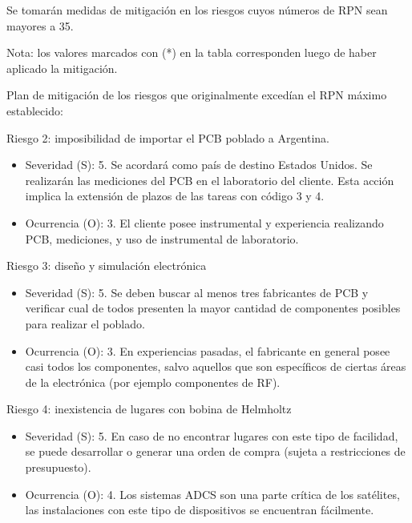 \documentclass[
11pt, %
]{charter}
\begin{document}
Se tomarán medidas de mitigación en los riesgos cuyos números de RPN sean mayores a 35.

Nota: los valores marcados con (*) en la tabla corresponden luego de haber aplicado la
mitigación.

Plan de mitigación de los riesgos que originalmente excedían el RPN máximo establecido:



Riesgo 2: imposibilidad de importar el PCB poblado a Argentina.
\begin{itemize}
	\item Severidad (S): 5.
	\newline Se acordará como país de destino Estados Unidos. Se realizarán las mediciones del PCB en el laboratorio del cliente. Esta acción implica la extensión de plazos de las tareas con código 3 y 4. 
	\item Ocurrencia (O): 3.\newline 
	El cliente posee instrumental y experiencia realizando PCB, mediciones, y uso de instrumental de laboratorio. 
\end{itemize}


Riesgo 3: diseño y simulación electrónica 
\begin{itemize}
	\item Severidad (S): 5. 
	\newline 
	Se deben buscar al menos tres fabricantes de PCB y verificar cual de todos presenten la mayor cantidad de componentes posibles para realizar el poblado.   
	\item Ocurrencia (O): 3.
	\newline En experiencias pasadas, el fabricante en general posee casi todos los componentes, salvo aquellos que son específicos de ciertas áreas de la electrónica (por ejemplo componentes de RF). 
\end{itemize}



Riesgo 4: inexistencia de lugares con bobina de Helmholtz
\begin{itemize}
	\item Severidad (S): 5.
	\newline  En caso de no encontrar lugares con este tipo de facilidad, se puede desarrollar o generar una orden de compra (sujeta a restricciones de presupuesto). 
	\item Ocurrencia (O): 4.\newline 
	Los sistemas ADCS son una parte crítica de los satélites, las instalaciones 
	con este tipo de dispositivos se encuentran fácilmente. 
\end{itemize}
\end{document}
